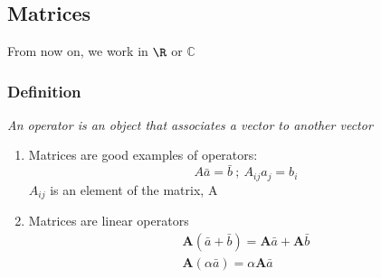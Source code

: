 \documentclass[a4paper, 11pt, normalem]{report}
\begin{document}
\chapter{}
\section{Matrices}
From now on, we work in $\R$ or $\mathbb{C}$

\subsection{Definition}
\emph{An operator is an object that associates a vector to another vector}
\begin{enumerate}
    \item Matrices are good examples of operators:
            \begin{equation*}
                A\bar{a} = \bar{b} ~;~ A_{ij}a_j = b_i
            \end{equation*}
          $A_{ij}$ is an element of the matrix, A
    \item Matrices are linear operators
            \begin{gather*}
                \mathbf{A}(\bar{a} + \bar{b}) = \mathbf{A}\bar{a} + \mathbf{A}\bar{b} \\
                \mathbf{A}(\alpha\bar{a}) = \alpha \mathbf{A}\bar{a}
            \end{gather*}
\end{enumerate}
\end{document}
